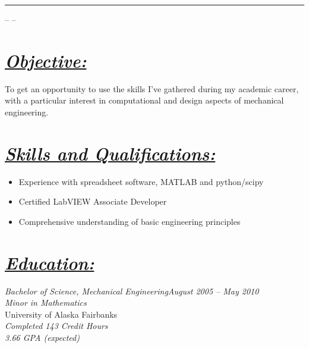 \documentclass[10pt, letterpaper]{article}
\author{Joshua Holbrook}
\begin{document}
\textbf{\Huge \theauthor }\hrule
\smallskip\small \theaddress -- \phonenumber -- \emailaddress \normalsize

\section*{\underline{\textit{Objective:}}}
\small To get an opportunity to use the skills I've gathered during my academic career,
with a particular interest in computational and design aspects of mechanical
engineering.\normalsize

\section*{\underline{\textit{Skills and Qualifications:}}}
\small\begin{itemize}
\item Experience with spreadsheet software, MATLAB and python/scipy
\item Certified LabVIEW Associate Developer
\item Comprehensive understanding of basic engineering principles
\end{itemize}\normalsize


\section*{\underline{\textit{Education:}}}
\large\textit{Bachelor of Science, Mechanical Engineering\hfill August 2005 -- May 2010}\normalsize \\
\textit{Minor in Mathematics}\\
University of Alaska Fairbanks\\
\emph{Completed 143 Credit Hours}\\
\emph{3.66 GPA (expected)}
\end{document}
